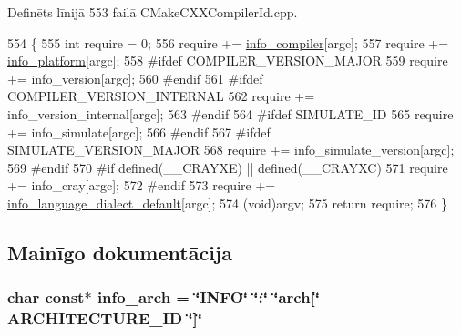 Definēts līnijā 553 failā C\+Make\+C\+X\+X\+Compiler\+Id.\+cpp.


\begin{DoxyCode}
554 \{
555   \textcolor{keywordtype}{int} require = 0;
556   require += \hyperlink{build_2_c_make_files_23_85_81_2_compiler_id_c_x_x_2_c_make_c_x_x_compiler_id_8cpp_a4b0efeb7a5d59313986b3a0390f050f6}{info\_compiler}[argc];
557   require += \hyperlink{build_2_c_make_files_23_85_81_2_compiler_id_c_x_x_2_c_make_c_x_x_compiler_id_8cpp_a2321403dee54ee23f0c2fa849c60f7d4}{info\_platform}[argc];
558 \textcolor{preprocessor}{#ifdef COMPILER\_VERSION\_MAJOR}
559   require += info\_version[argc];
560 \textcolor{preprocessor}{#endif}
561 \textcolor{preprocessor}{#ifdef COMPILER\_VERSION\_INTERNAL}
562   require += info\_version\_internal[argc];
563 \textcolor{preprocessor}{#endif}
564 \textcolor{preprocessor}{#ifdef SIMULATE\_ID}
565   require += info\_simulate[argc];
566 \textcolor{preprocessor}{#endif}
567 \textcolor{preprocessor}{#ifdef SIMULATE\_VERSION\_MAJOR}
568   require += info\_simulate\_version[argc];
569 \textcolor{preprocessor}{#endif}
570 \textcolor{preprocessor}{#if defined(\_\_CRAYXE) || defined(\_\_CRAYXC)}
571   require += info\_cray[argc];
572 \textcolor{preprocessor}{#endif}
573   require += \hyperlink{build_2_c_make_files_23_85_81_2_compiler_id_c_x_x_2_c_make_c_x_x_compiler_id_8cpp_a1ce162bad2fe6966ac8b33cc19e120b8}{info\_language\_dialect\_default}[argc];
574   (void)argv;
575   \textcolor{keywordflow}{return} require;
576 \}
\end{DoxyCode}


\subsection{Mainīgo dokumentācija}
\subsubsection[{\texorpdfstring{info\+\_\+arch}{info_arch}}]{\setlength{\rightskip}{0pt plus 5cm}char const$\ast$ info\+\_\+arch = \char`\"{}I\+N\+FO\char`\"{} \char`\"{}\+:\char`\"{} \char`\"{}arch\mbox{[}\char`\"{} A\+R\+C\+H\+I\+T\+E\+C\+T\+U\+R\+E\+\_\+\+ID \char`\"{}\mbox{]}\char`\"{}}\hypertarget{cmake-build-release_2_c_make_files_23_810_82_2_compiler_id_c_x_x_2_c_make_c_x_x_compiler_id_8cpp_a59647e99d304ed33b15cb284c27ed391}{}\label{cmake-build-release_2_c_make_files_23_810_82_2_compiler_id_c_x_x_2_c_make_c_x_x_compiler_id_8cpp_a59647e99d304ed33b15cb284c27ed391}


